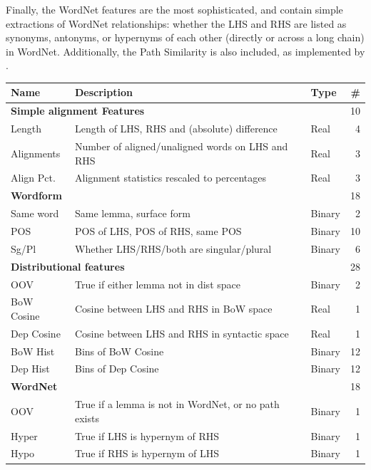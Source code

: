 Finally, the WordNet features are the most sophisticated, and contain simple
extractions of WordNet relationships: whether the LHS and RHS are listed as
synonyms, antonyms, or hypernyms of each other (directly or across a long
chain) in WordNet. Additionally, the Path Similarity is also included, as
implemented by .



\begin{table}
\centering
\begin{small}
\begin{tabular}{|lllr|}
    \hline
    \bf{Name} & \bf{Description} & \bf{Type} & \bf{\#}\\
    \hline\hline
    \multicolumn{3}{|l}{\bf{Simple alignment Features}} & 10 \\
    \hline
    Length & Length of LHS, RHS and (absolute) difference & Real & 4\\
    Alignments & Number of aligned/unaligned words on LHS and RHS & Real & 3\\
    Align Pct. & Alignment statistics rescaled to percentages & Real & 3\\
    \hline\hline
    \multicolumn{3}{|l}{\bf{Wordform}} & 18\\
    \hline
    Same word & Same lemma, surface form & Binary & 2\\
    POS & POS of LHS, POS of RHS, same POS & Binary & 10\\
    Sg/Pl & Whether LHS/RHS/both are singular/plural & Binary & 6\\
    \hline
    \hline
    \multicolumn{3}{|l}{\bf Distributional features} & 28\\
    \hline
    OOV & True if either lemma not in dist space & Binary & 2\\
    BoW Cosine & Cosine between LHS and RHS in BoW space & Real & 1\\
    Dep Cosine & Cosine between LHS and RHS in syntactic space & Real & 1\\
    BoW Hist & Bins of BoW Cosine & Binary & 12\\
    Dep Hist & Bins of Dep Cosine & Binary & 12\\
    \hline
    \hline
    \multicolumn{3}{|l}{\bf WordNet} & 18\\
    \hline
    OOV & True if a lemma is not in WordNet, or no path exists & Binary & 1\\
    Hyper & True if LHS is hypernym of RHS & Binary & 1\\
    Hypo & True if RHS is hypernym of LHS & Binary & 1\\

\end{tabular}
\end{small}
\end{table}
